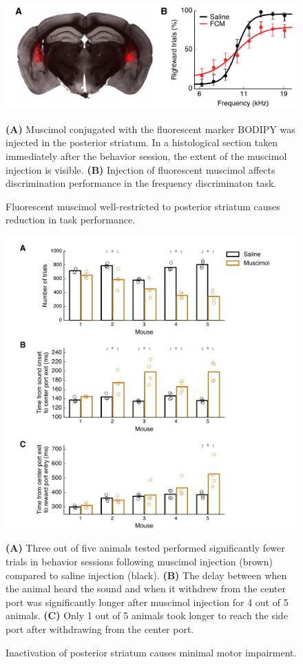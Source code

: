 \begin{figure}[!p]
  \begin{center}
    \includegraphics[width=5in]{figures/chapter2/SFig4_muscimol_inactivation_fluorescent}%
  \end{center}
  \caption{Fluorescent muscimol well-restricted to posterior striatum causes reduction in task performance.}{\textbf{(A)} Muscimol conjugated with the fluorescent marker BODIPY was injected in the posterior striatum. In a histological section taken immediately after the behavior session, the extent of the muscimol injection is visible. \textbf{(B)} Injection of fluorescent muscimol affects discrimination performance in the frequency discriminaton task.}
\end{figure}



\begin{figure}[!p]
  \begin{center}
    \includegraphics[width=5in]{figures/chapter2/SFig5_muscimol_inactivation_numtrials}%
  \end{center}
  \caption{Inactivation of posterior striatum causes minimal motor impairment.}{\textbf{(A)} Three out of five animals tested performed significantly fewer trials in behavior sessions following muscimol injection (brown) compared to saline injection (black). \textbf{(B)} The delay between when the animal heard the sound and when it withdrew from the center port was significantly longer after muscimol injection for 4 out of 5 animals. \textbf{(C)} Only 1 out of 5 animals took longer to reach the side port after withdrawing from the center port.}
\end{figure}

